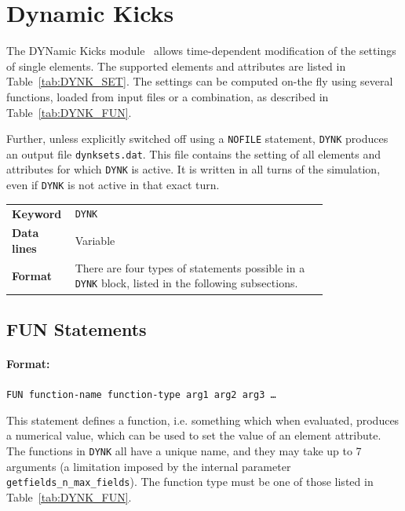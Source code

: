 \section{Dynamic Kicks} \label{sec:DYNK}

The DYNamic Kicks module~\cite{DYNKpaper, DYNKpaper2} allows time-dependent modification of the settings of single elements.
The supported elements and attributes are listed in Table~\ref{tab:DYNK_SET}.
The settings can be computed on-the fly using several functions, loaded from input files or a combination, as described in Table~\ref{tab:DYNK_FUN}.

Further, unless explicitly switched off using a \texttt{NOFILE} statement, \texttt{DYNK} produces an output file \texttt{dynksets.dat}.
This file contains the setting of all elements and attributes for which \texttt{DYNK} is active.
It is written in all turns of the simulation, even if \texttt{DYNK} is not active in that exact turn.

\bigskip
\begin{tabular}{@{}lp{0.8\linewidth}}
    \textbf{Keyword}    & \texttt{DYNK}\index{DYNK} \\
    \textbf{Data lines} & Variable \\
    \textbf{Format}     & There are four types of statements possible in a \texttt{DYNK} block, listed in the following subsections.\\
\end{tabular}

\bigskip

\subsection{FUN Statements} \label{DYNK:FUN}

\paragraph{Format:}
\texttt{FUN function-name function-type arg1 arg2 arg3 \ldots}

\bigskip
This statement defines a function, i.e. something which when evaluated, produces a numerical value, which can be used to set the value of an element attribute.
The functions in \texttt{DYNK} all have a unique name, and they may take up to 7 arguments (a limitation imposed by the internal parameter \texttt{getfields\_n\_max\_fields}).
The function type must be one of those listed in Table~\ref{tab:DYNK_FUN}.

